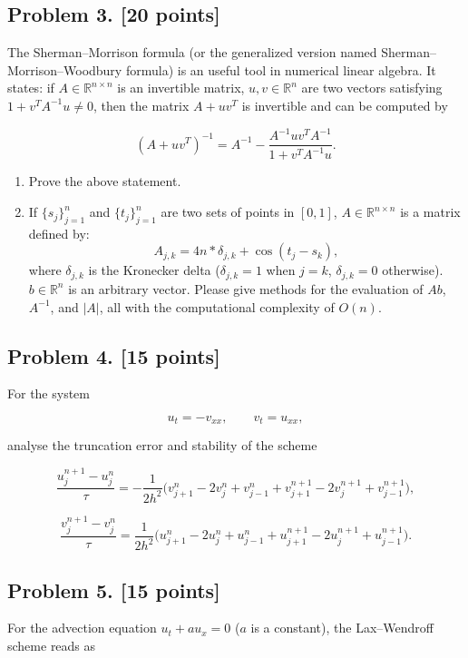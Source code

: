 \documentclass[11pt,a4paper]{article}
\begin{document}


\subsection{Problem 3. [20 points]}
The Sherman--Morrison formula (or the generalized version named Sherman--Morrison--Woodbury formula) is an useful tool in numerical linear algebra. It states: if \(A \in \mathbb{R}^{n \times n}\) is an invertible matrix, \(u, v \in \mathbb{R}^{n}\) are two vectors satisfying \(1 + v^{T} A^{-1} u \neq 0\), then the matrix \(A + uv^{T}\) is invertible and can be computed by

\[
(A + uv^{T})^{-1} = A^{-1} - \frac{A^{-1} uv^{T} A^{-1}}{1 + v^{T} A^{-1} u}.
\]

\begin{enumerate}[label=(\roman*)]
    \item Prove the above statement.
    \item If \(\{s_{j}\}_{j=1}^{n}\) and \(\{t_{j}\}_{j=1}^{n}\) are two sets of points in \([0, 1]\), \(A \in \mathbb{R}^{n \times n}\) is a matrix defined by:
    \[
    A_{j,k} = 4n * \delta_{j,k} + \cos(t_{j} - s_{k}),
    \]
    where \(\delta_{j,k}\) is the Kronecker delta (\(\delta_{j,k} = 1\) when \(j = k\), \(\delta_{j,k} = 0\) otherwise). \(b \in \mathbb{R}^{n}\) is an arbitrary vector. Please give methods for the evaluation of \(Ab\), \(A^{-1}\), and \(|A|\), all with the computational complexity of \(O(n)\).
\end{enumerate}

\subsection{Problem 4. [15 points]}
For the system

\[
u_{t} = -v_{xx}, \qquad v_{t} = u_{xx},
\]

analyse the truncation error and stability of the scheme

\[
\frac{u_{j}^{n+1} - u_{j}^{n}}{\tau} = -\frac{1}{2h^{2}}\bigl(v_{j+1}^{n} - 2v_{j}^{n} + v_{j-1}^{n} + v_{j+1}^{n+1} - 2v_{j}^{n+1} + v_{j-1}^{n+1}\bigr),
\]

\[
\frac{v_{j}^{n+1} - v_{j}^{n}}{\tau} = \frac{1}{2h^{2}}\bigl(u_{j+1}^{n} - 2u_{j}^{n} + u_{j-1}^{n} + u_{j+1}^{n+1} - 2u_{j}^{n+1} + u_{j-1}^{n+1}\bigr).
\]

\subsection{Problem 5. [15 points]}
For the advection equation \(u_{t} + a u_{x} = 0\) (\(a\) is a constant), the Lax--Wendroff scheme reads as
\end{document}

